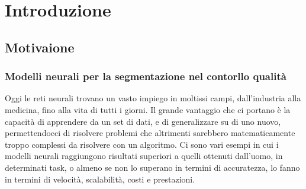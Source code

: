 \chapter{Introduzione}

\section{Motivaione \ok}

\subsection{Modelli neurali per la segmentazione nel contorllo qualità\ok}

Oggi le reti neurali trovano un vasto impiego in moltissi campi, dall'industria alla medicina, fino alla vita di tutti i giorni.
Il grande vantaggio che ci portano è la capacità di apprendere da un set di dati, e di generalizzare su di uno nuovo,
permettendocci di risolvere problemi che altrimenti sarebbero matematicamente troppo complessi da risolvere con un algoritmo.
Ci sono vari esempi in cui i modelli neurali raggiungono risultati superiori a quelli ottenuti dall'uomo, in determinati task, 
o almeno se non lo superano in termini di accuratezza, lo fanno in termini di velocità, scalabilità, costi e prestazioni.

